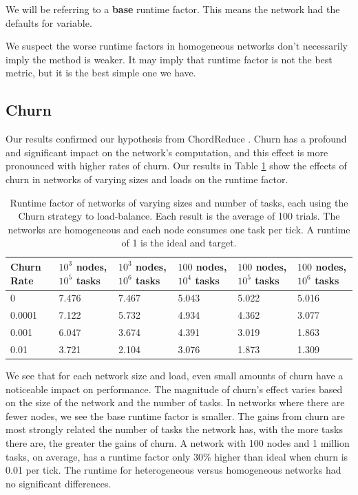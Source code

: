 \documentclass[11pt,letterpaper]{article}
\begin{document}
We will be referring to a \textbf{base} runtime factor.
This means the network had the defaults for variable.
{We suspect the worse runtime factors in homogeneous networks don't necessarily imply the method is weaker.
	It may imply that runtime factor is not the best metric, but it is the best simple one we have.
	
	
	\subsection{Churn}
	
	Our results confirmed our hypothesis from ChordReduce \cite{chordreduce}.
	Churn has a profound and significant impact on the network's computation, and this effect is more pronounced with higher rates of churn.
	Our results in Table \ref{tab:ChurnRuntimesHomogenious} show the effects of churn in networks of varying sizes and loads on the runtime factor.
	
	
	\begin{table}[h]
		\small
		\centering
		\caption[Churn Runtimes in a homogenious network]{Runtime factor of networks of varying sizes and number of tasks, each using the Churn strategy to load-balance.  Each result is the average of 100 trials. The networks are homogeneous and each node consumes one task per tick.  A runtime of 1 is the ideal and target.}
		\begin{tabular}{|p{1cm} || p{1cm}  |p{1cm}  |p{1cm}  | p{1cm}  | p{1cm}  |}
			\hline
			Churn Rate & $ 10^{3}$ nodes, $ 10^{5}$ tasks & $ 10^{3}$ nodes, $ 10^{6}$ tasks & $ 100$ nodes, $ 10^{4}$ tasks & $ 100$ nodes, $ 10^{5}$ tasks &$ 100$ nodes, $ 10^{6}$ tasks \\ \hline
			0      & 7.476   &  7.467 &  5.043& 5.022 &5.016 \\\hline
			0.0001 & 7.122   &  5.732 &  4.934& 4.362&3.077 \\\hline
			0.001  & 6.047   &  3.674 &  4.391& 3.019  &1.863\\\hline
			0.01  &  3.721   &  2.104 &  3.076& 1.873 &1.309\\\hline
			
		\end{tabular}
		\label{tab:ChurnRuntimesHomogenious}
	\end{table}
	
	We see that for each network size and load, even small amounts of churn have a noticeable impact on performance.
	The magnitude of churn's effect varies based on the size of the network and the number of tasks.
	In networks where there are fewer nodes, we see the base runtime factor is smaller.
	The gains from churn are most strongly related the number of tasks the network has, with the more tasks there are, the greater the gains of churn.
	A network with 100 nodes and 1 million tasks, on average, has a runtime factor only 30\% higher than ideal when churn is 0.01 per tick.
	The runtime for heterogeneous versus homogeneous networks had no significant differences.
	
}
\end{document}
